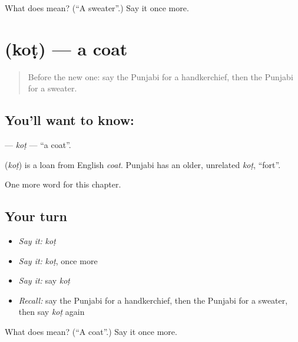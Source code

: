 \begin{tcolorbox}[breakable,colback=teal!4,colframe=teal!35!black,title={Before you move on}]
What does  mean? (\textquotedblleft{}A sweater\textquotedblright{}.) Say it once more.
\end{tcolorbox}
\section[\texorpdfstring{\pa{ਕੋਟ} (koṭ)}{ਕੋਟ (koṭ)}]{ (koṭ) — a coat}

\label{lesson:PA-C120-kot}



\begin{quote}
Before the new one: say the Punjabi for a handkerchief, then the Punjabi for a sweater.
\end{quote}

\subsection*{You'll want to know: }
\textbf{} — \emph{koṭ} — \textquotedblleft{}a coat\textquotedblright{}.

\begin{cousinweb}
\textbf{} (\emph{koṭ}) is a loan from English \emph{coat}. Punjabi has an older, unrelated \emph{koṭ}, \textquotedblleft{}fort\textquotedblright{}.
\end{cousinweb}

\begin{grammarlens}[title={What you've built}]
One more word for this chapter.
\end{grammarlens}

\subsection*{Your turn}
\begin{itemize}
\raggedright
  \item \emph{Say it:} \emph{koṭ}
  \item \emph{Say it:} \emph{koṭ}, once more
  \item \emph{Say it:} say \emph{koṭ}
  \item \emph{Recall:} say the Punjabi for a handkerchief, then the Punjabi for a sweater, then say \emph{koṭ} again
\end{itemize}

\begin{tcolorbox}[breakable,colback=teal!4,colframe=teal!35!black,title={Before you move on}]
What does  mean? (\textquotedblleft{}A coat\textquotedblright{}.) Say it once more.
\end{tcolorbox}
